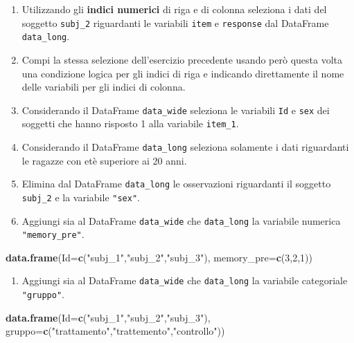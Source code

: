 \documentclass[
]{book}
\newenvironment{Shaded}{\begin{snugshade}}{\end{snugshade}}
\newcommand{\DataTypeTok}[1]{\textcolor[rgb]{0.13,0.29,0.53}{#1}}
\newcommand{\DecValTok}[1]{\textcolor[rgb]{0.00,0.00,0.81}{#1}}
\newcommand{\KeywordTok}[1]{\textcolor[rgb]{0.13,0.29,0.53}{\textbf{#1}}}
\newcommand{\NormalTok}[1]{#1}
\newcommand{\StringTok}[1]{\textcolor[rgb]{0.31,0.60,0.02}{#1}}
\providecommand{\tightlist}{%
  \setlength{\itemsep}{0pt}\setlength{\parskip}{0pt}}
\begin{document}
\begin{enumerate}
\def\labelenumi{\arabic{enumi}.}
\tightlist
\item
  Utilizzando gli \textbf{indici numerici} di riga e di colonna seleziona i dati del soggetto \texttt{subj\_2} riguardanti le variabili \texttt{item} e \texttt{response} dal DataFrame \texttt{data\_long}.
\item
  Compi la stessa selezione dell'esercizio precedente usando però questa volta una condizione logica per gli indici di riga e indicando direttamente il nome delle variabili per gli indici di colonna.
\item
  Considerando il DataFrame \texttt{data\_wide} seleziona le variabili \texttt{Id} e \texttt{sex} dei soggetti che hanno risposto 1 alla variabile \texttt{item\_1}.
\item
  Considerando il DataFrame \texttt{data\_long} seleziona solamente i dati riguardanti le ragazze con etè superiore ai 20 anni.
\item
  Elimina dal DataFrame \texttt{data\_long} le osservazioni riguardanti il soggetto \texttt{subj\_2} e la variabile \texttt{"sex"}.
\item
  Aggiungi sia al DataFrame \texttt{data\_wide} che \texttt{data\_long} la variabile numerica \texttt{"memory\_pre"}.
\end{enumerate}

\begin{Shaded}
\begin{Highlighting}[]
\KeywordTok{data.frame}\NormalTok{(}\DataTypeTok{Id=}\KeywordTok{c}\NormalTok{(}\StringTok{"subj_1"}\NormalTok{,}\StringTok{"subj_2"}\NormalTok{,}\StringTok{"subj_3"}\NormalTok{),}
                      \DataTypeTok{memory_pre=}\KeywordTok{c}\NormalTok{(}\DecValTok{3}\NormalTok{,}\DecValTok{2}\NormalTok{,}\DecValTok{1}\NormalTok{))}
\end{Highlighting}
\end{Shaded}

\begin{enumerate}
\def\labelenumi{\arabic{enumi}.}
\setcounter{enumi}{6}
\tightlist
\item
  Aggiungi sia al DataFrame \texttt{data\_wide} che \texttt{data\_long} la variabile categoriale \texttt{"gruppo"}.
\end{enumerate}

\begin{Shaded}
\begin{Highlighting}[]
\KeywordTok{data.frame}\NormalTok{(}\DataTypeTok{Id=}\KeywordTok{c}\NormalTok{(}\StringTok{"subj_1"}\NormalTok{,}\StringTok{"subj_2"}\NormalTok{,}\StringTok{"subj_3"}\NormalTok{),}
                      \DataTypeTok{gruppo=}\KeywordTok{c}\NormalTok{(}\StringTok{"trattamento"}\NormalTok{,}\StringTok{"trattemento"}\NormalTok{,}\StringTok{"controllo"}\NormalTok{))}
\end{Highlighting}
\end{Shaded}
\end{document}
